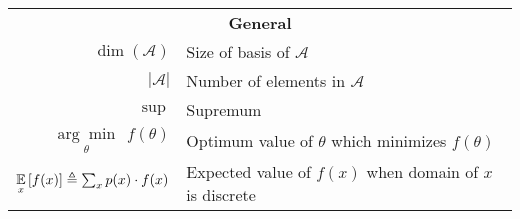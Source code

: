\begin{table*}[!htbp]
\begin{center}
\begin{tabular}{r@{\hskip 0.4in} l}
    \\[0.1in] \multicolumn{2}{c}{\textbf{General}} \\[0.1in]

    $\dim(\mathcal{A})$ & Size of basis of $\mathcal{A}$ \\
    $|\mathcal{A}|$ & Number of elements in $\mathcal{A}$ \\
    $\operatorname{sup}$ & Supremum \\
    $\underset{\theta}{\operatorname{arg} \operatorname{min}} ~~ f(\theta)$ & Optimum value of $\theta$ which minimizes $f(\theta)$ \\
    $\underset{x}{\mathbb{E}} \left[f(x)\right] \triangleq \sum_x p(x) \cdot f(x)$ & Expected value of $f(x)$ when domain of $x$ is discrete
\end{tabular}
\end{center}
\end{table*}



% 
